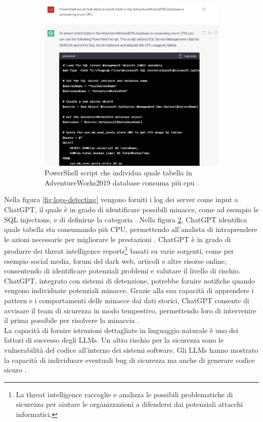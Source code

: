 \begin{figure}[ht]
\begin{subfigure}{0.3\textwidth}
		\includegraphics[width=1.0\textwidth]{Immagini/cpu_consuming_detecting.png}
		\caption{PowerShell script che individua quale tabella in AdventureWorks2019 database consuma più cpu \cite{calbimonte2023powershell}.}
            \label{fig:cpu-consuming}
	\end{subfigure}
	\caption{}
\end{figure}

Nella figura \ref{fig:logs-detecting} vengono forniti i log dei server come input a ChatGPT, il quale è in grado di identificare possibili minacce, come ad esempio le SQL injections, e di definirne la categoria \cite{calbimonte2023powershell}.
Nella figura \ref{fig:cpu-consuming}, ChatGPT identifica quale tabella sta consumando più CPU, permettendo all'analista di intraprendere le azioni necessarie per migliorare le prestazioni \cite{calbimonte2023powershell}.
ChatGPT è in grado di produrre dei threat intelligence reports\footnote{La threat intelligence raccoglie e analizza le possibili problematiche di sicurezza per aiutare le organizzazioni a difendersi dai potenziali attacchi informatici.} basati su varie sorgenti, come per esempio social media, forum del dark web, articoli e altre risorse online, consentendo di identificare potenziali problemi e valutare il livello di rischio.
ChatGPT, integrato con sistemi di detenzione, potrebbe fornire notifiche quando vengono individuate potenziali minacce. Grazie alla sua capacità di apprendere i pattern e i comportamenti delle minacce dai dati storici, ChatGPT consente di avvisare il team di sicurezza in modo tempestivo, permettendo loro di intervenire il prima possibile per risolvere la minaccia \cite{10198233}.\\
La capacità di fornire istruzioni dettagliate in linguaggio naturale è uno dei fattori di successo degli LLMs.
Un altro rischio per la sicurezza sono le vulnerabilità del codice all'interno dei sistemi software.
Gli LLMs hanno mostrato la capacità di individuare eventuali bug di sicurezza ma anche di generare codice sicuro \cite{10198233}.

